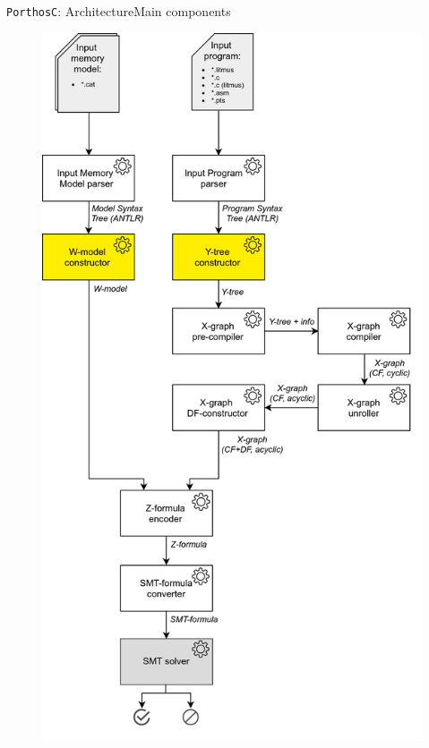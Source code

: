 \documentclass[aspectratio=149]{beamer}
\newcommand{\tool}[1]{\texttt{#1}}
\begin{document}
\begin{frame}{\tool{PorthosC}: Architecture}{Main components}
\begin{minipage}{.5\textwidth}
{\begin{figure}
  \includegraphics[height=.98\textheight,keepaspectratio]{img/arch/general_arch-no_numbering-visitors.png}
\end{figure}}
\end{minipage}
\end{frame}
\end{document}
